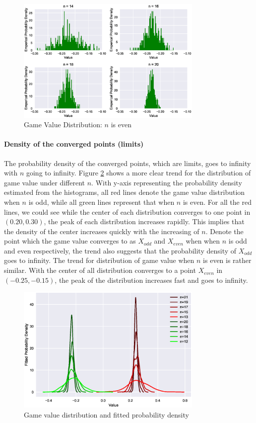 \documentclass[a4paper,english]{article}
\begin{document}
\begin{spacing}{1.4}
\begin{figure}[htb!] \label{distribution-even}
\centering
\includegraphics[width=0.8\textwidth]{figures/plot3.eps}
\caption{Game Value Distribution: $n$ is even}
\end{figure}
\paragraph{Density of the converged points (limits)}
The probability density of the converged points, which are limits, goes to infinity with $n$ going to infinity.
Figure \ref{game-value-pdf} shows a more clear trend for the distribution of game value under different $n$. With y-axis representing the probability density estimated from the histograms, all red lines denote the game value distribution when $n$ is odd, while all green lines represent that when $n$ is even. For all the red lines, we could see while the center of each distribution converges to one point in $(0.20,0.30)$, the peak of each distribution increases rapidly. This implies that the density of the center increases quickly with the increasing of $n$. Denote the point which the game value converges to as $X_{odd}$ and $X_{even}$ when when $n$ is odd and even respectively, the trend also suggests that the probability density of $X_{odd}$ goes to infinity. The trend for distribution of game value when $n$ is even is rather similar. With the center of all distribution converges to a point $X_{even}$ in $(-0.25, -0.15)$, the peak of the distribution increases fast and goes to infinity.
\begin{figure}[htb!] \label{game-value-pdf}
\centering
\includegraphics[width=0.8\textwidth]{figures/plot4.eps}
\caption{Game value distribution and fitted probability density}
\end{figure}


\end{spacing}
\end{document}
